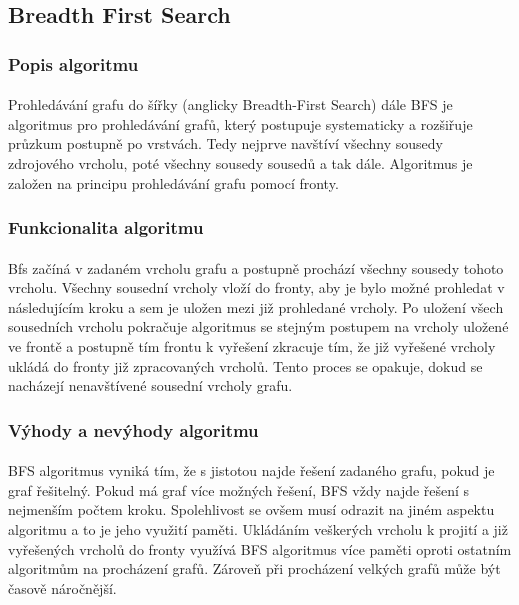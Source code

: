 \documentclass[12pt]{article}
\begin{document}
\subsection{Breadth First Search}
\subsubsection{Popis algoritmu}
\paragraph{}
Prohledávání grafu do šířky (anglicky Breadth-First Search) dále BFS je algoritmus 
pro prohledávání grafů, který postupuje systematicky a rozšiřuje průzkum postupně po 
vrstvách. Tedy nejprve navštíví všechny sousedy zdrojového vrcholu, poté všechny sousedy 
sousedů a tak dále. Algoritmus je založen na principu prohledávání grafu pomocí fronty.
\subsubsection{Funkcionalita algoritmu}
\paragraph{}
Bfs začíná v zadaném vrcholu grafu a postupně prochází všechny sousedy tohoto vrcholu. 
Všechny sousední vrcholy vloží do fronty, aby je bylo možné prohledat v následujícím kroku 
a sem je uložen mezi již prohledané vrcholy. Po uložení všech sousedních vrcholu pokračuje 
algoritmus se stejným postupem na vrcholy uložené ve frontě a postupně tím frontu k vyřešení 
zkracuje tím, že již vyřešené vrcholy ukládá do fronty již zpracovaných vrcholů. Tento proces 
se opakuje, dokud se nacházejí nenavštívené sousední vrcholy grafu.

\subsubsection{Výhody a nevýhody algoritmu}
\paragraph{}
BFS algoritmus vyniká tím, že s jistotou najde řešení zadaného grafu, pokud je graf řešitelný.
Pokud má graf více možných řešení, BFS vždy najde řešení s nejmenším počtem kroku. Spolehlivost 
se ovšem musí odrazit na jiném aspektu algoritmu a to je jeho využití paměti. Ukládáním veškerých 
vrcholu k projití a již vyřešených vrcholů do fronty využívá BFS algoritmus více paměti oproti ostatním algoritmům
na procházení grafů. Zároveň při procházení velkých grafů může být časově náročnější.
\end{document}
